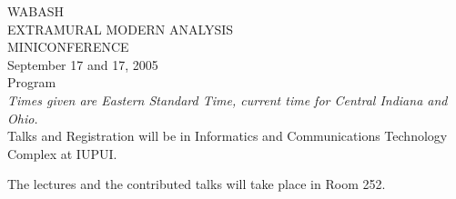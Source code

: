 \vspace{2ex}
\begin{center}
{\TitleFont WABASH}\\
\smallskip
{\SubTitleFont EXTRAMURAL MODERN ANALYSIS}\\
\smallskip
{\TitleFont MINICONFERENCE}\\
\vspace{.2in}
 {\DateFont   September 17 and 17, 2005}\\
\vspace{.2in}
{\TitleFont Program}\\[.2in]

{\em Times given are Eastern Standard Time,
current time for Central Indiana and Ohio.}\\[.3in]


Talks and Registration will be in Informatics and Communications Technology Complex at IUPUI.

The
lectures and the contributed talks will take place in Room 252.
\end{center} \smallskip

